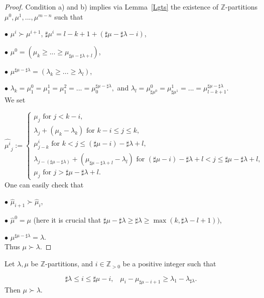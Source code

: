 \documentclass[10pt]{amsart}\oddsidemargin -1mm \evensidemargin -1mm \topmargin -15mm\headheight5mm \headsep 3.5mm \textheight 245mm\textwidth 170mm %
\begin{document}
\begin{proof}Condition a) and b) implies via Lemma~\ref{Lgts} the existence of $\mathbb Z$-partitions $\mu^0, \mu^1,..., \mu^{m-n}$ such that

$\bullet$ $\mu^{i}\succ\mu^{i+1}$, $\sharp\mu^i=l-k+1+(\sharp\mu-\sharp\lambda-i)$,

$\bullet$ $\mu^0=(\mu_k\ge...\ge\mu_{\sharp\mu-\sharp\lambda+l})$,

$\bullet$ $\mu^{\sharp\mu-\sharp\lambda}=(\lambda_k\ge ...\ge \lambda_l)$,

$\bullet$ $\lambda_k=\mu^0_1=\mu_1^1=\mu^2_1=...=\mu^{\sharp\mu-\sharp\lambda}_0,$ and $\lambda_l=\mu^0_{\sharp\mu^0}=\mu^1_{\sharp\mu^1}=...=\mu^{\sharp\mu-\sharp\lambda}_{l-k+1}$.\\
We set

$$\hat{\mu^i}_j:=\begin{cases}\mu_j\mbox{~for~}j< k-i,\\
\lambda_j+(\mu_k-\lambda_k)\mbox{~for~}k-i\le j\le k,\\
\mu^i_{j-k}\mbox{~for~}k<j\le (\sharp\mu-i)-\sharp\lambda+l,\\
\lambda_{j-(\sharp\mu-\sharp\lambda)}+(\mu_{\sharp\mu-\sharp\lambda+l}-\lambda_l)\mbox{~for~}(\sharp\mu-i)-\sharp\lambda+l< j\le \sharp\mu-\sharp\lambda+l,\\
\mu_j\mbox{~for~}j>\sharp\mu-\sharp\lambda+l.\end{cases}$$
One can easily check that

$\bullet$ $\hat \mu_{i+1}\succ\hat \mu_i$,

$\bullet$ $\hat \mu^0=\mu$ (here it is crucial that $\sharp\mu-\sharp\lambda\ge \sharp\lambda\ge\max(k, \sharp\lambda-l+1))$,

$\bullet$ $\mu^{\sharp\mu-\sharp\lambda}=\lambda$.\\
Thus $\mu\succ\lambda$.\end{proof}
\begin{lemma}\label{Lfir} Let $\lambda, \mu$ be $\mathbb Z$-partitions, and $i\in\mathbb Z_{>0}$ be a positive integer such that

$$\sharp \lambda \le i\le \sharp\mu-i,\hspace{10pt}\mu_i-\mu_{\sharp\mu-i+1}\ge\lambda_1-\lambda_{\sharp\lambda}.$$
Then $\mu\succ\lambda$.\end{lemma}
\end{document}
